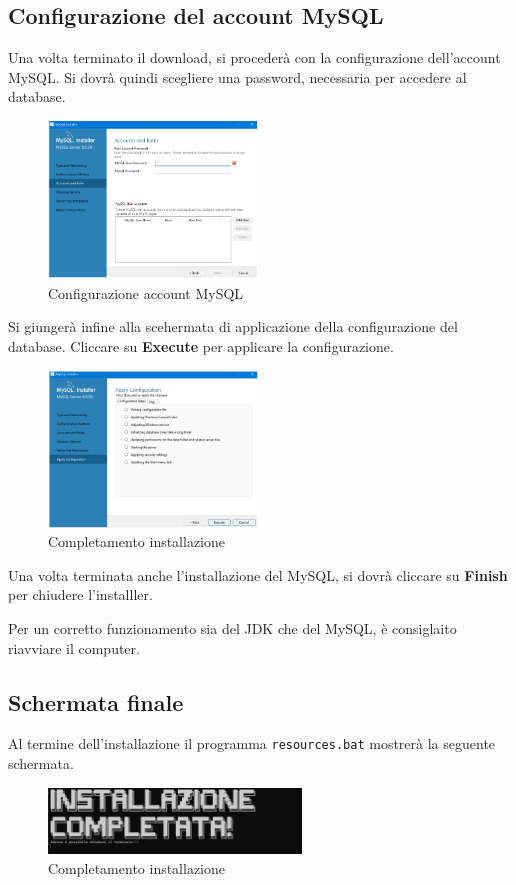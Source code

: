 \subsection{Configurazione del account MySQL}
Una volta terminato il download, si procederà con la configurazione dell'account MySQL. Si dovrà quindi scegliere una password, necessaria per accedere al database. 


\begin{figure}[h!]
    \centering
    \includegraphics[width= 0.5\textwidth]{images/setup vero e proio musql.png}
    \caption{Configurazione account MySQL}
\end{figure}


Si giungerà infine alla scehermata di applicazione della configurazione del database. Cliccare su \textbf{Execute} per applicare la configurazione.

\begin{figure}[h!]
    \centering
    \includegraphics[width= 0.5\textwidth]{images/completamenot.png}
    \caption{Completamento installazione}
\end{figure}

Una volta terminata anche l'installazione del MySQL, si dovrà cliccare su \textbf{Finish} per chiudere l'installler. 

\begin{tcolorbox}[  colback=white!5!white, colframe=gray, title={Avvertenza} ]
    Per un corretto funzionamento sia del JDK che del MySQL, è consiglaito riavviare il computer.
    
\end{tcolorbox}


\subsection{Schermata finale}
Al termine dell'installazione il programma \texttt{resources.bat} mostrerà la seguente schermata. 

\begin{figure}[h!]
    \centering
    \includegraphics[width= 0.6\textwidth]{images/insytllazione compeltata.png}
    \caption{Completamento installazione}
\end{figure}
